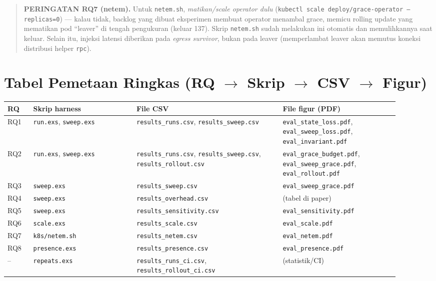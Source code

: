 \documentclass[11pt]{article}
\newcommand{\code}[1]{\texttt{\small #1}}
\begin{document}
\begin{quote}
\textbf{PERINGATAN RQ7 (netem).} Untuk \code{netem.sh}, \emph{matikan/scale operator dulu}
(\code{kubectl scale deploy/grace-operator --replicas=0}) --- kalau tidak, backlog yang dibuat
eksperimen membuat operator menambal grace, memicu rolling update yang mematikan pod ``leaver'' di
tengah pengukuran (keluar 137). Skrip \code{netem.sh} sudah melakukan ini otomatis dan memulihkannya
saat keluar. Selain itu, injeksi latensi diberikan pada \emph{egress survivor}, bukan pada leaver
(memperlambat leaver akan memutus koneksi distribusi helper \code{rpc}).
\end{quote}

\section{\texorpdfstring{Tabel Pemetaan Ringkas (RQ $\rightarrow$ Skrip $\rightarrow$ CSV $\rightarrow$ Figur)}{Tabel Pemetaan Ringkas (RQ - Skrip - CSV - Figur)}}
\label{sec:pemetaan}

\begin{longtable}{@{}p{0.06\linewidth} p{0.24\linewidth} p{0.34\linewidth} p{0.27\linewidth}@{}}
\toprule
\textbf{RQ} & \textbf{Skrip harness} & \textbf{File CSV} & \textbf{File figur (PDF)} \\
\midrule
\endhead
RQ1 & \code{run.exs}, \code{sweep.exs} & \code{results\_runs.csv}, \code{results\_sweep.csv} & \code{eval\_state\_loss.pdf}, \code{eval\_sweep\_loss.pdf}, \code{eval\_invariant.pdf} \\
RQ2 & \code{run.exs}, \code{sweep.exs} & \code{results\_runs.csv}, \code{results\_sweep.csv}, \code{results\_rollout.csv} & \code{eval\_grace\_budget.pdf}, \code{eval\_sweep\_grace.pdf}, \code{eval\_rollout.pdf} \\
RQ3 & \code{sweep.exs} & \code{results\_sweep.csv} & \code{eval\_sweep\_grace.pdf} \\
RQ4 & \code{sweep.exs} & \code{results\_overhead.csv} & (tabel di paper) \\
RQ5 & \code{sweep.exs} & \code{results\_sensitivity.csv} & \code{eval\_sensitivity.pdf} \\
RQ6 & \code{scale.exs} & \code{results\_scale.csv} & \code{eval\_scale.pdf} \\
RQ7 & \code{k8s/netem.sh} & \code{results\_netem.csv} & \code{eval\_netem.pdf} \\
RQ8 & \code{presence.exs} & \code{results\_presence.csv} & \code{eval\_presence.pdf} \\
-- & \code{repeats.exs} & \code{results\_runs\_ci.csv}, \code{results\_rollout\_ci.csv} & (statistik/CI) \\
\bottomrule
\end{longtable}
\end{document}
